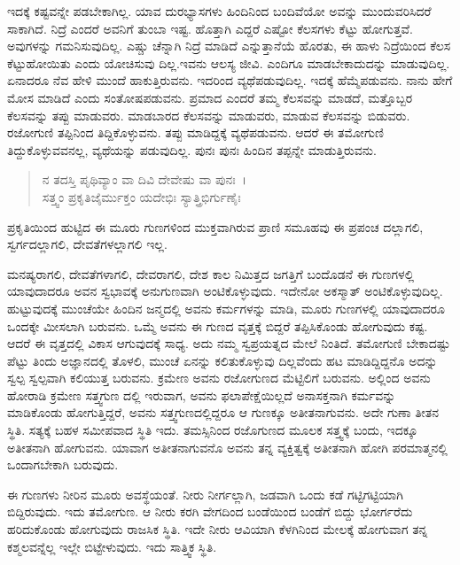 ಇದಕ್ಕೆ ಕಷ್ಟವನ್ನೇ ಪಡಬೇಕಾಗಿಲ್ಲ. ಯಾವ ದುರಭ್ಯಾಸಗಳು ಹಿಂದಿನಿಂದ ಬಂದಿವೆಯೋ ಅವನ್ನು ಮುಂದುವರಿಸಿದರೆ ಸಾಕಾಗಿದೆ. ನಿದ್ರೆ ಎಂದರೆ ಅವನಿಗೆ ತುಂಬಾ ಇಷ್ಟ. ಹೊತ್ತಾಗಿ ಎದ್ದರೆ ಎಷ್ಟೋ ಕೆಲಸಗಳು ಕೆಟ್ಟು ಹೋಗುತ್ತವೆ. ಅವುಗಳನ್ನು ಗಮನಿಸುವುದಿಲ್ಲ. ಎಷ್ಚು ಚೆನ್ನಾಗಿ ನಿದ್ರೆ ಮಾಡಿದೆ ಎನ್ನುತ್ತಾನೆಯೆ ಹೊರತು, ಈ ಹಾಳು ನಿದ್ರೆಯಿಂದ ಕೆಲಸ ಕೆಟ್ಟುಹೋಯಿತು ಎಂದು ಯೋಚಿಸುವು ದಿಲ್ಲ.ಇವನು ಆಲಸ್ಯ ಜೀವಿ. ಎಂದಿಗೂ ಮಾಡಬೇಕಾದುದನ್ನು ಮಾಡುವುದಿಲ್ಲ. ಏನಾದರೂ ನೆವ ಹೇಳಿ ಮುಂದೆ ಹಾಕುತ್ತಿರುವನು. ಇದರಿಂದ ವ್ಯಥೆಪಡುವುದಿಲ್ಲ. ಇದಕ್ಕೆ ಹೆಮ್ಮೆಪಡುವನು. ನಾನು ಹೇಗೆ ಮೋಸ ಮಾಡಿದೆ ಎಂದು ಸಂತೋಷಪಡುವನು. ಪ್ರಮಾದ ಎಂದರೆ ತಮ್ಮ ಕೆಲಸವನ್ನು ಮಾಡದೆ, ಮತ್ತೊಬ್ಬರ ಕೆಲಸವನ್ನು ತಪ್ಪು ಮಾಡುವರು. ಮಾಡಬಾರದ ಕೆಲಸವನ್ನು ಮಾಡುವರು, ಮಾಡುವ ಕೆಲಸವನ್ನು ಬಿಡುವರು. ರಜೋಗುಣಿ ತಪ್ಪಿನಿಂದ ತಿದ್ದಿಕೊಳ್ಳುವನು. ತಪ್ಪು ಮಾಡಿದ್ದಕ್ಕೆ ವ್ಯಥೆಪಡುವನು. ಆದರೆ ಈ ತಮೋಗುಣಿ ತಿದ್ದುಕೊಳ್ಳುವವನಲ್ಲ, ವ್ಯಥೆಯನ್ನು ಪಡುವುದಿಲ್ಲ. ಪುನಃ ಪುನಃ ಹಿಂದಿನ ತಪ್ಪನ್ನೇ ಮಾಡುತ್ತಿರುವನು.

\begin{verse}
ನ ತದಸ್ತಿ ಪೃಥಿವ್ಯಾಂ ವಾ ದಿವಿ ದೇವೇಷು ವಾ ಪುನಃ~।\\ಸತ್ತ್ವಂ ಪ್ರಕೃತಿಜೈರ್ಮುಕ್ತಂ ಯದೇಭಿಃ ಸ್ಯಾತ್ತ್ರಿಭಿರ್ಗುಣೈಃ 
\end{verse}

{\small ಪ್ರಕೃತಿಯಿಂದ ಹುಟ್ಟಿದ ಈ ಮೂರು ಗುಣಗಳಿಂದ ಮುಕ್ತವಾಗಿರುವ ಪ್ರಾಣಿ ಸಮೂಹವು ಈ ಪ್ರಪಂಚ ದಲ್ಲಾಗಲಿ, ಸ್ವರ್ಗದಲ್ಲಾಗಲಿ, ದೇವತೆಗಳಲ್ಲಾಗಲಿ ಇಲ್ಲ.}

ಮನಷ್ಯರಾಗಲಿ, ದೇವತೆಗಳಾಗಲಿ, ದೇವರಾಗಲಿ, ದೇಶ ಕಾಲ ನಿಮಿತ್ತದ ಜಗತ್ತಿಗೆ ಬಂದೊಡನೆ ಈ ಗುಣಗಳಲ್ಲಿ ಯಾವುದಾದರೂ ಅವನ ಸ್ವಭಾವಕ್ಕೆ ಅನುಗುಣವಾಗಿ ಅಂಟಿಕೊಳ್ಳುವುದು. ಇದೇನೋ ಅಕಸ್ಮಾತ್ ಅಂಟಿಕೊಳ್ಳುವುದಿಲ್ಲ. ಹುಟ್ಟುವುದಕ್ಕೆ ಮುಂಚೆಯೇ ಹಿಂದಿನ ಜನ್ಮದಲ್ಲಿ ಅವನು ಕರ್ಮಗಳನ್ನು ಮಾಡಿ, ಮೂರು ಗುಣಗಳಲ್ಲಿ ಯಾವುದಾದರೂ ಒಂದಕ್ಕೇ ಮೀಸಲಾಗಿ ಬರುವನು. ಒಮ್ಮೆ ಅವನು ಈ ಗುಣದ ವೃತ್ತಕ್ಕೆ ಬಿದ್ದರೆ ತಪ್ಪಿಸಿಕೊಂಡು ಹೋಗುವುದು ಕಷ್ಟ. ಆದರೆ ಈ ವೃತ್ತದಲ್ಲಿ ವಿಕಾಸ ಆಗುವುದಕ್ಕೆ ಸಾಧ್ಯ. ಅದು ನಮ್ಮ ಸ್ವಪ್ರಯತ್ನದ ಮೇಲೆ ನಿಂತಿದೆ. ತಮೋಗುಣಿ ಬೇಕಾದಷ್ಟು ಪೆಟ್ಟು ತಿಂದು ಅಜ್ಞಾನದಲ್ಲಿ ತೊಳಲಿ, ಮುಂಚೆ ಏನನ್ನು ಕಲಿತುಕೊಳ್ಳುವು ದಿಲ್ಲವೆಂದು ಹಟ ಮಾಡಿದ್ದಿದ್ದನೊ ಅದನ್ನು ಸ್ವಲ್ಪ ಸ್ವಲ್ಪವಾಗಿ ಕಲಿಯುತ್ತ ಬರುವನು. ಕ್ರಮೇಣ ಅವನು ರಜೋಗುಣದ ಮೆಟ್ಟಿಲಿಗೆ ಬರುವನು. ಅಲ್ಲಿಂದ ಅವನು ಹೋರಾಡಿ ಕ್ರಮೇಣ ಸತ್ತ್ವಗುಣ ದಲ್ಲಿ ಇರುವಾಗ, ಅವನು ಫಲಾಪೇಕ್ಷೆಯಿಲ್ಲದೆ ಅನಾಸಕ್ತನಾಗಿ ಕರ್ಮವನ್ನು ಮಾಡಿಕೊಂಡು ಹೋಗುತ್ತಿದ್ದರೆ, ಅವನು ಸತ್ತ್ವಗುಣದಲ್ಲಿದ್ದರೂ ಆ ಗುಣಕ್ಕೂ ಅತೀತನಾಗುವನು. ಅದೇ ಗುಣಾ ತೀತನ ಸ್ಥಿತಿ. ಸತ್ಯಕ್ಕೆ ಬಹಳ ಸಮೀಪವಾದ ಸ್ಥಿತಿ ಇದು. ತಮಸ್ಸಿನಿಂದ ರಜೊಗುಣದ ಮೂಲಕ ಸತ್ತ್ವಕ್ಕೆ ಬಂದು, ಇದಕ್ಕೂ ಅತೀತನಾಗಿ ಹೋಗುವನು. ಯಾವಾಗ ಅತೀತನಾಗುವನೊ ಅವನು ತನ್ನ ವ್ಯಕ್ತಿತ್ವಕ್ಕೆ ಅತೀತನಾಗಿ ಹೋಗಿ ಪರಮಾತ್ಮನಲ್ಲಿ ಒಂದಾಗಬೇಕಾಗಿ ಬರುವುದು.

ಈ ಗುಣಗಳು ನೀರಿನ ಮೂರು ಅವಸ್ಥೆಯಂತೆ. ನೀರು ನೀರ್ಗಲ್ಲಾಗಿ, ಜಡವಾಗಿ ಒಂದು ಕಡೆ ಗಟ್ಟಿಗಟ್ಟಿಯಾಗಿ ಬಿದ್ದಿರುವುದು. ಇದು ತಮೋಗುಣ. ಆ ನೀರು ಕರಗಿ ವೇಗದಿಂದ ಬಂಡೆಯಿಂದ ಬಂಡೆಗೆ ಬಿದ್ದು ಭೋರ್ಗರೆದು ಹರಿದುಕೊಂಡು ಹೋಗುವುದು ರಾಜಸಿಕ ಸ್ಥಿತಿ. ಇದೇ ನೀರು ಆವಿಯಾಗಿ ಕೆಳಗಿನಿಂದ ಮೇಲಕ್ಕೆ ಹೋಗುವಾಗ ತನ್ನ ಕಶ್ಮಲವನ್ನೆಲ್ಲ ಇಲ್ಲೇ ಬಿಟ್ಟೇಳುವುದು. ಇದು ಸಾತ್ತ್ವಿಕ ಸ್ಥಿತಿ.

